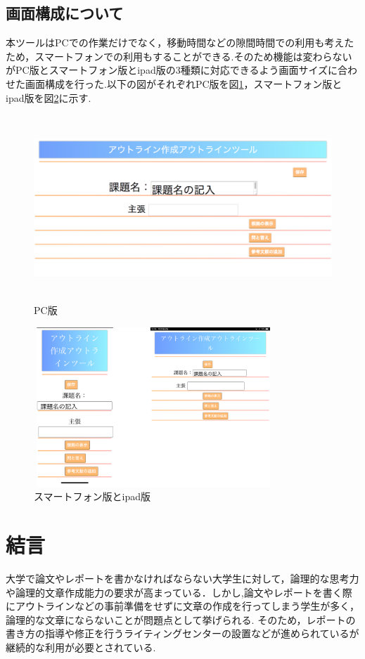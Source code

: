 \documentclass[a4j,12pt]{jarticle}
\begin{document}
\newpage
\subsection{画面構成について}
本ツールはPCでの作業だけでなく，移動時間などの隙間時間での利用も考えたため，スマートフォンでの利用もすることができる.そのため機能は変わらないがPC版とスマートフォン版とipad版の3種類に対応できるよう画面サイズに合わせた画面構成を行った.以下の図がそれぞれPC版を図\ref{fig:p}，スマートフォン版とipad版を図\ref{fig:q}に示す.
\begin{figure}[h]
\begin{center}
 \includegraphics[clip,width=130mm,height=70mm]{figure/08gamen.png}
\end{center}
 \caption{PC版}
 \label{fig:p}
\end{figure}

\begin{figure}[h]
\begin{center}
 \includegraphics[clip,width=90mm,height=60mm]{figure/17.png}
\end{center}
 \caption{スマートフォン版とipad版}
 \label{fig:q}
\end{figure}

\newpage
\section{結言}
大学で論文やレポートを書かなければならない大学生に対して，論理的な思考力や論理的文章作成能力の要求が高まっている．しかし,論文やレポートを書く際にアウトラインなどの事前準備をせずに文章の作成を行ってしまう学生が多く，論理的な文章にならないことが問題点として挙げられる.
そのため，レポートの書き方の指導や修正を行うライティングセンターの設置などが進められているが継続的な利用が必要とされている.
\end{document}
